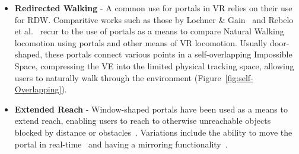 \begin{itemize}
    \item \textbf{Redirected Walking} - A common use for portals in \gls{VR} relies on their use for \gls{RDW}. 
    Comparitive works such as those by Lochner \& Gain~\cite{Lochner2021} 
    and Rebelo et al.~\cite{Rebelo2024b} recur to the use of portals as a means to compare Natural Walking locomotion using portals and 
    other means of \gls{VR} locomotion.
    Usually door-shaped, these portals connect various points in a self-overlapping Impossible Space, compressing the \gls{VE} into 
    the limited physical tracking space, allowing users to naturally walk through the environment (Figure~\ref{fig:self-Overlapping}).
    
    \item \textbf{Extended Reach} - Window-shaped portals have been used as a means to extend reach, enabling users to reach to otherwise 
    unreachable objects blocked by distance or obstacles~\cite{Han2022,Ablett2024}. Variations include the ability to move the portal in real-time~\cite{Ablett2024} 
    and having a mirroring functionality~\cite{Li2021}.
    

\end{itemize}
